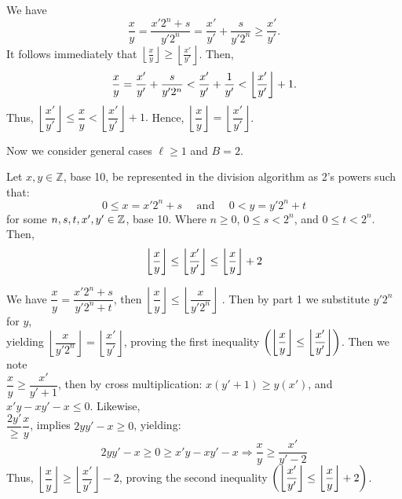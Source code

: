 \newpage

\begin{Proof}

    We have
\[
\frac{x}{y} = \frac{x'2^n+s}{y'2^n} =\frac{x'}{y'} + \frac{s}{y'2^n} \geq \frac{x'}{y'}.
\]
It follows immediately that $ \left\lfloor \frac{x}{y} \right\rfloor \geq \left\lfloor \frac{x'}{y'} \right\rfloor$. Then,
\[
\frac{x}{y} = \frac{x'}{y'} + \frac{s}{y'2^n} < \frac{x'}{y'}+\frac{1}{y'}<\floor*{\frac{x'}{y'}} + 1.
\]
Thus, $
    \left\lfloor \dfrac{x'}{y'} \right\rfloor\leq \dfrac{x}{y} < \left\lfloor \dfrac{x'}{y'} \right\rfloor + 1.
$
Hence, $\left\lfloor \dfrac{x}{y} \right\rfloor = \left\lfloor \dfrac{x'}{y'} \right\rfloor$.
\end{Proof}
\noindent
Now we consider general cases $\ell\geq1$ and $B=2$.
\begin{theo}
    
    Let $x,y\in\mathbb{Z}$, base 10, be represented in the division algorithm as 2's powers such that:
    \[0\leq x=x'2^n+s \quad \text{ and } \quad 0 < y = y'2^n+t\]
    \noindent
    for some $n,s,t,x',y'\in\Z$, base 10. Where $n\geq 0$, $0\leq s < 2^n$, and $0\leq t < 2^n$. Then,
    \[\left\lfloor \frac{x}{y} \right\rfloor \leq\floor*{\frac{x'}{y'}}\leq \floor*{\frac{x}{y}}+2\]

\end{theo}

\begin{Proof}

    We have $ \dfrac{x}{y} = \dfrac{x'2^n+s}{y'2^n+t}$, then $\left\lfloor \dfrac{x}{y} \right\rfloor \leq \left\lfloor \dfrac{x}{y'2^n} \right\rfloor$
    . Then by part 1 we substitute $y'2^n$ for $y$,\\
    yielding $\left\lfloor \dfrac{x}{y'2^n} \right\rfloor = \left\lfloor \dfrac{x'}{y'} \right\rfloor$, proving the first inequality $\left( \left\lfloor \dfrac{x}{y} \right\rfloor \leq\floor*{\dfrac{x'}{y'}}\right)$.
    Then we note\\
    $\dfrac{x}{y} \geq \dfrac{x'}{y'+1}$, then by cross multiplication: $x(y'+1) \geq y(x')$, and $x'y-xy'-x \leq 0$. Likewise,\\
    $\dfrac{2y'}\geq \dfrac{x}{y}$, implies $2yy'-x\geq 0$, yielding:\\
    \[
    2yy'-x\geq 0 \geq x'y-xy'-x \Longrightarrow \frac{x}{y}\geq \frac{x'}{y'-2}
    \]
    Thus, $\left\lfloor \dfrac{x}{y} \right\rfloor \geq \left\lfloor \dfrac{x'}{y'} \right\rfloor -2$, proving the second inequality $\left( \floor*{\dfrac{x'}{y'}}\leq \floor*{\dfrac{x}{y}}+2\right)$.
    
\end{Proof}

